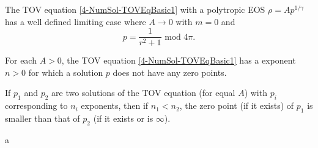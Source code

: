 \begin{theorem}
	The TOV equation \ref{4-NumSol-TOVEqBasic1} with a polytropic EOS $\rho=Ap^{1/\gamma}$ has a well defined limiting case where $A\rightarrow0$ with $m=0$ and
	\begin{equation}
		p = \frac{1}{r^2+1} \text{ mod } 4\pi.
	\end{equation}
\end{theorem}
\begin{theorem}
	For each $A>0$, the TOV equation \ref{4-NumSol-TOVEqBasic1} has a exponent $n>0$ for which a solution $p$ does not have any zero points.
\end{theorem}
\begin{theorem}
	If $p_1$ and $p_2$ are two solutions of the TOV equation (for equal $A$) with $p_i$ corresponding to $n_i$ exponents, then if $n_1<n_2$, the zero point (if it exists) of $p_1$ is smaller than that of $p_2$ (if it exists or is $\infty$).
\end{theorem}
\begin{theorem}
	a
\end{theorem}




